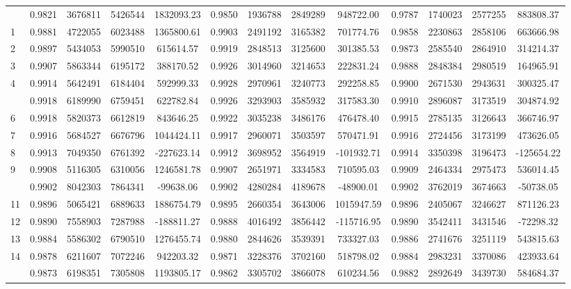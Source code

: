 \documentclass[
  12pt,
]{article}
\begin{document}
\begin{longtable}[t]{lcccccccccccc}
\endfoot
\bottomrule
\endlastfoot
0 & 0.9821 & 3676811 & 5426544 & 1832093.23 & 0.9850 & 1936788 & 2849289 & 948722.00 & 0.9787 & 1740023 & 2577255 & 883808.37\\
1 & 0.9881 & 4722055 & 6023488 & 1365800.61 & 0.9903 & 2491192 & 3165382 & 701774.76 & 0.9858 & 2230863 & 2858106 & 663666.98\\
2 & 0.9897 & 5434053 & 5990510 & 615614.57 & 0.9919 & 2848513 & 3125600 & 301385.53 & 0.9873 & 2585540 & 2864910 & 314214.37\\
3 & 0.9907 & 5863344 & 6195172 & 388170.52 & 0.9926 & 3014960 & 3214653 & 222831.24 & 0.9888 & 2848384 & 2980519 & 164965.91\\
4 & 0.9914 & 5642491 & 6184404 & 592999.33 & 0.9928 & 2970961 & 3240773 & 292258.85 & 0.9900 & 2671530 & 2943631 & 300325.47\\
\addlinespace
5 & 0.9918 & 6189990 & 6759451 & 622782.84 & 0.9926 & 3293903 & 3585932 & 317583.30 & 0.9910 & 2896087 & 3173519 & 304874.92\\
6 & 0.9918 & 5820373 & 6612819 & 843646.25 & 0.9922 & 3035238 & 3486176 & 476478.40 & 0.9915 & 2785135 & 3126643 & 366746.97\\
7 & 0.9916 & 5684527 & 6676796 & 1044424.11 & 0.9917 & 2960071 & 3503597 & 570471.91 & 0.9916 & 2724456 & 3173199 & 473626.05\\
8 & 0.9913 & 7049350 & 6761392 & -227623.14 & 0.9912 & 3698952 & 3564919 & -101932.71 & 0.9914 & 3350398 & 3196473 & -125654.22\\
9 & 0.9908 & 5116305 & 6310056 & 1246581.78 & 0.9907 & 2651971 & 3334583 & 710595.03 & 0.9909 & 2464334 & 2975473 & 536014.45\\
\addlinespace
10 & 0.9902 & 8042303 & 7864341 & -99638.06 & 0.9902 & 4280284 & 4189678 & -48900.01 & 0.9902 & 3762019 & 3674663 & -50738.05\\
11 & 0.9896 & 5065421 & 6889633 & 1886754.79 & 0.9895 & 2660354 & 3643006 & 1015947.59 & 0.9896 & 2405067 & 3246627 & 871126.23\\
12 & 0.9890 & 7558903 & 7287988 & -188811.27 & 0.9888 & 4016492 & 3856442 & -115716.95 & 0.9890 & 3542411 & 3431546 & -72298.32\\
13 & 0.9884 & 5586302 & 6790510 & 1276455.74 & 0.9880 & 2844626 & 3539391 & 733327.03 & 0.9886 & 2741676 & 3251119 & 543815.63\\
14 & 0.9878 & 6211607 & 7072246 & 942203.32 & 0.9871 & 3228376 & 3702160 & 518798.02 & 0.9884 & 2983231 & 3370086 & 423933.64\\
\addlinespace
15 & 0.9873 & 6198351 & 7305808 & 1193805.17 & 0.9862 & 3305702 & 3866078 & 610234.56 & 0.9882 & 2892649 & 3439730 & 584684.37\\

\end{longtable}
\end{document}
